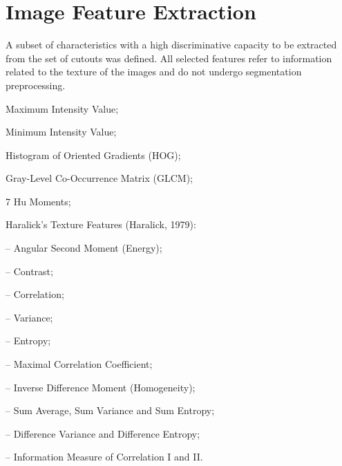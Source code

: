 \chapter{Image Feature Extraction}

A subset of characteristics
with a high discriminative capacity
to be extracted
from the set of cutouts
was defined.
All selected features
refer to information related to the texture of the images
and do not undergo segmentation preprocessing.



Maximum Intensity Value;

Minimum Intensity Value;



Histogram of Oriented Gradients (HOG);

Gray-Level Co-Occurrence Matrix (GLCM);

7 Hu Moments;

Haralick’s Texture Features (Haralick, 1979):

– Angular Second Moment (Energy);

– Contrast;

– Correlation;

– Variance;

– Entropy;

– Maximal Correlation Coefficient;

– Inverse Difference Moment (Homogeneity);

– Sum Average, Sum Variance and Sum Entropy;

– Difference Variance and Difference Entropy;

– Information Measure of Correlation I and II.




